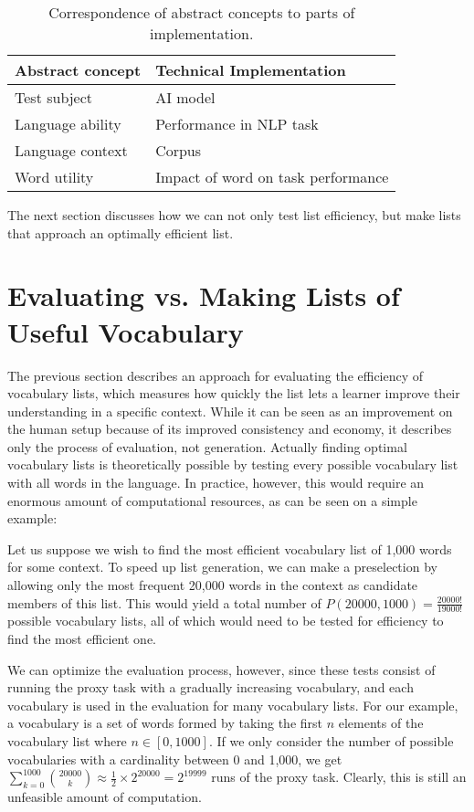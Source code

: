 \begin{table}[ht]
	\centering
	\begin{tabularx}{\textwidth}{|X|X|}
		\hline
		\textbf{Abstract concept} & \textbf{Technical Implementation}  \\
		\hline
		Test subject              & AI model                           \\
		\hline
		Language ability          & Performance in NLP task            \\
		\hline
		Language context          & Corpus                             \\
		\hline
		Word utility              & Impact of word on task performance \\
		\hline
	\end{tabularx}
	\caption{Correspondence of abstract concepts to parts of implementation.}
	\label{table:concept-implementation-correspondence}
\end{table}

The next section discusses how we can not only test list efficiency, but make lists that approach an optimally efficient list.

\section{Evaluating vs. Making Lists of Useful Vocabulary} \label{sec:eval-vs-creation}
The previous section describes an approach for evaluating the efficiency of vocabulary lists, which measures how quickly the list lets a learner improve their understanding in a specific context.
While it can be seen as an improvement on the human setup because of its improved consistency and economy, it describes only the process of evaluation, not generation.
Actually finding optimal vocabulary lists is theoretically possible by testing every possible vocabulary list with all words in the language.
In practice, however, this would require an enormous amount of computational resources, as can be seen on a simple example:

Let us suppose we wish to find the most efficient vocabulary list of 1,000 words for some context.
To speed up list generation, we can make a preselection by allowing only the most frequent 20,000 words in the context as candidate members of this list.
This would yield a total number of $P(20000, 1000) = \frac{20000!}{19000!}$ possible vocabulary lists, all of which would need to be tested for efficiency to find the most efficient one.

We can optimize the evaluation process, however, since these tests consist of running the proxy task with a gradually increasing vocabulary, and each vocabulary is used in the evaluation for many vocabulary lists.
For our example, a vocabulary is a set of words formed by taking the first $n$ elements of the vocabulary list where $n \in [0, 1000]$.
If we only consider the number of possible vocabularies with a cardinality between 0 and 1,000, we get
$
	\sum_{k=0}^{1000} \binom{20000}{k} \approx \frac{1}{2} \times 2^{20000} = 2^{19999}
$ runs of the proxy task. Clearly, this is still an unfeasible amount of computation.

